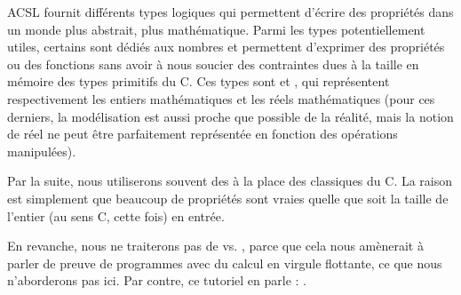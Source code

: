ACSL fournit différents types logiques qui permettent d'écrire des
propriétés dans un monde plus abstrait, plus mathématique. Parmi les types
potentiellement utiles, certains sont dédiés aux nombres et permettent d'exprimer
des propriétés ou des fonctions sans avoir à nous soucier des contraintes dues
à la taille en mémoire des types primitifs du C. Ces types sont 
et , qui représentent respectivement les entiers mathématiques et
les réels mathématiques (pour ces derniers, la modélisation est aussi proche que
possible de la réalité, mais la notion de réel ne peut être parfaitement
représentée en fonction des opérations manipulées).



Par la suite, nous utiliserons souvent des  à la place des
classiques  du C. La raison est simplement que beaucoup de
propriétés sont vraies quelle que soit la taille de l'entier (au sens C, cette
fois) en entrée.



En revanche, nous ne traiterons pas de  vs. , parce que
cela nous amènerait à parler de preuve de programmes avec du calcul en virgule
flottante, ce que nous n'aborderons pas ici. Par contre, ce tutoriel en parle :
.
